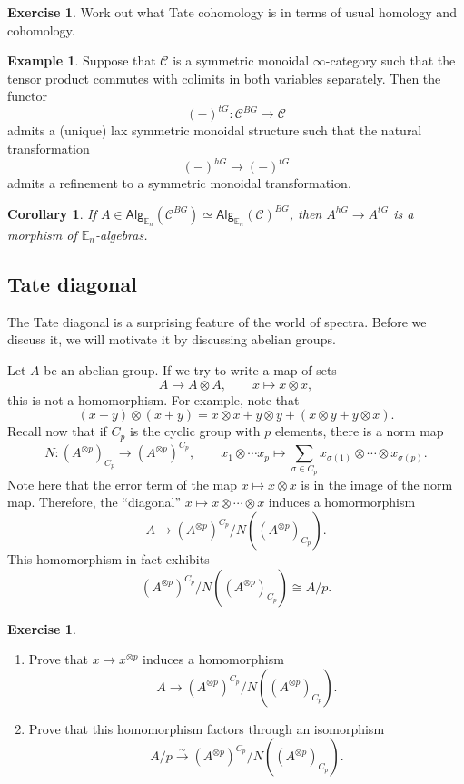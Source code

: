 \documentclass[10pt, oneside]{memoir}
\newtheorem{cor}[thm]{Corollary}
\theoremstyle{definition}
\newtheorem{exm}[thm]{Example}
\newtheorem{exer}[thm]{Exercise}
\theoremstyle{remark}
\theoremstyle{plain}
\theoremstyle{definition}
\theoremstyle{remark}
\newcommand{\E}{\mathbb{E}}
\newcommand{\mc}[1]{\mathcal{#1}}
\newcommand{\ms}[1]{\mathsf{#1}}
\newcommand{\1}{\mathbf{1}}
\newcommand{\2}{\mathbf{2}}
\newcommand{\3}{\mathbf{3}}
\begin{document}
\begin{exer}
    Work out what Tate cohomology is in terms of usual homology and cohomology.
\end{exer}

\begin{exm}
    Suppose that \(\mc{C} \) is a symmetric monoidal \(\infty \)-category such that the tensor product commutes with colimits in both variables separately. Then the functor
    \[ (-)^{tG} \colon \mc{C}^{BG} \to \mc{C} \]
    admits a (unique) lax symmetric monoidal structure such that the natural transformation
    \[ (-)^{hG} \to (-)^{tG} \]
    admits a refinement to a symmetric monoidal transformation.
\end{exm}

\begin{cor}
    If \(A \in \ms{Alg}_{\E_n}(\mc{C}^{BG}) \simeq \ms{Alg}_{\E_n}(\mc{C})^{BG} \), then \(A^{hG} \to A^{tG} \) is a morphism of \(\E_n \)-algebras.
\end{cor}

\subsection{Tate diagonal}%
\label{sub:Tate diagonal}

The Tate diagonal is a surprising feature of the world of spectra. Before we discuss it, we will motivate it by discussing abelian groups.

Let \(A \) be an abelian group. If we try to write a map of sets
\[ A \to A \otimes A, \qquad x \mapsto x\otimes x, \]
this is not a homomorphism. For example, note that
\[ (x+y) \otimes (x+y) = x \otimes x + y \otimes y + (x\otimes y + y \otimes x). \]
Recall now that if \(C_p \) is the cyclic group with \(p \) elements, there is a norm map
\[ N \colon (A^{\otimes p})_{C_p} \to (A^{\otimes p})^{C_p}, \qquad x_1 \otimes \cdots x_p \mapsto \sum_{\sigma \in C_p} x_{\sigma(1)} \otimes \cdots \otimes x_{\sigma(p)}. \]
Note here that the error term of the map \(x \mapsto x \otimes x \) is in the image of the norm map. Therefore, the ``diagonal'' \(x \mapsto x \otimes \cdots \otimes x \) induces a homormorphism
\[ A \to (A^{\otimes p})^{C_p}/N((A^{\otimes p})_{C_p}). \]
This homomorphism in fact exhibits
\[ (A^{\otimes p})^{C_p} / N((A^{\otimes p})_{C_p}) \cong A/p. \]

\begin{exer}\leavevmode
    \begin{enumerate}
        \item Prove that \(x \mapsto x^{\otimes p} \) induces a homomorphism
        \[ A \to (A^{\otimes p})^{C_p}/N((A^{\otimes p})_{C_p}). \]
        \item Prove that this homomorphism factors through an isomorphism
        \[ A/p \xrightarrow{\sim} (A^{\otimes p})^{C_p}/N((A^{\otimes p})_{C_p}). \]
    \end{enumerate}
\end{exer}
\end{document}
